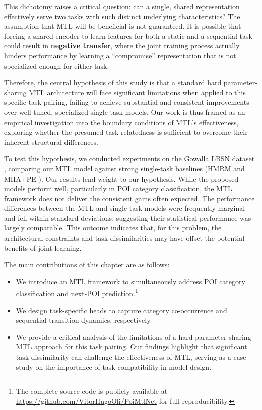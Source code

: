 This dichotomy raises a critical question: can a single, shared representation effectively serve two tasks with such distinct underlying characteristics? The assumption that MTL will be beneficial is not guaranteed. It is possible that forcing a shared encoder to learn features for both a static and a sequential task could result in \textbf{negative transfer}, where the joint training process actually hinders performance by learning a ``compromise'' representation that is not specialized enough for either task.

Therefore, the central hypothesis of this study is that a standard hard parameter-sharing MTL architecture will face significant limitations when applied to this specific task pairing, failing to achieve substantial and consistent improvements over well-tuned, specialized single-task models. Our work is thus framed as an empirical investigation into the boundary conditions of MTL's effectiveness, exploring whether the presumed task relatedness is sufficient to overcome their inherent structural differences.

To test this hypothesis, we conducted experiments on the Gowalla LBSN dataset \cite{cho2011gowalla,jure2014snap}, comparing our MTL model against strong single-task baselines (HMRM \cite{chen2020modeling} and MHA+PE \cite{zeng2019next}). Our results lend weight to our hypothesis. While the proposed models perform well, particularly in POI category classification, the MTL framework does not deliver the consistent gains often expected. The performance differences between the MTL and single-task models were frequently marginal and fell within standard deviations, suggesting their statistical performance was largely comparable. This outcome indicates that, for this problem, the architectural constraints and task dissimilarities may have offset the potential benefits of joint learning.

The main contributions of this chapter are as follows:
\begin{itemize}
    \item We introduce an MTL framework to simultaneously address POI category classification and next-POI prediction.\footnote{The complete source code is publicly available at \url{https://github.com/VitorHugoOli/PoiMtlNet} for full reproducibility.}
    \item We design task-specific heads to capture category co-occurrence and sequential transition dynamics, respectively.
    \item We provide a critical analysis of the limitations of a hard parameter-sharing MTL approach for this task pairing. Our findings highlight that significant task dissimilarity can challenge the effectiveness of MTL, serving as a case study on the importance of task compatibility in model design.
\end{itemize}

